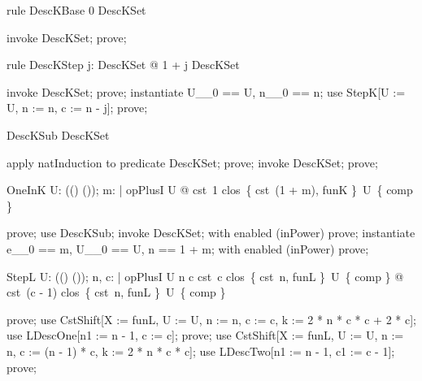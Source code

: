 \documentclass{article}
\begin{document}
\begin{theorem}{rule DescKBase}
  0 \in DescKSet
\end{theorem}

\begin{zproof}
invoke DescKSet;
prove;
\end{zproof}

\begin{theorem}{rule DescKStep}
  \forall j: DescKSet @ 1 + j \in DescKSet
\end{theorem}

\begin{zproof}
invoke DescKSet;
prove;
instantiate U\_\_0 == U, n\_\_0 == n;
use StepK[U := U, n := n, c := n - j];
prove;
\end{zproof}

\begin{theorem}{DescKSub}
  \nat \subseteq DescKSet
\end{theorem}

\begin{zproof}
apply natInduction to predicate \nat \subseteq DescKSet;
prove;
invoke DescKSet;
prove;
\end{zproof}

\begin{theorem}{OneInK}
  \forall U: \power ((\nat \fun \nat) \fun (\nat \fun \nat)); m: \nat | opPlusI \in U @ cst~1 \in clos~\{ cst~(1 + m), funK \}~U~\{ comp \}
\end{theorem}

\begin{zproof}
prove;
use DescKSub;
invoke DescKSet;
with enabled (inPower) prove;
instantiate e\_\_0 == m, U\_\_0 == U, n == 1 + m;
with enabled (inPower) prove;
\end{zproof}


\begin{theorem}{StepL}
  \forall U: \power ((\nat \fun \nat) \fun (\nat \fun \nat)); n, c: \nat | opPlusI \in U  \leq n  \leq c \land cst~c \in clos~\{ cst~n, funL \}~U~\{ comp \} @ cst~(c - 1) \in clos~\{ cst~n, funL \}~U~\{ comp \}
\end{theorem}

\begin{zproof}
prove;
use CstShift[X := funL, U := U, n := n, c := c, k := 2 * n * c * c + 2 * c];
use LDescOne[n1 := n - 1, c := c];
prove;
use CstShift[X := funL, U := U, n := n, c := (n - 1) * c, k := 2 * n * c * c];
use LDescTwo[n1 := n - 1, c1 := c - 1];
prove;
\end{zproof}
\end{document}
